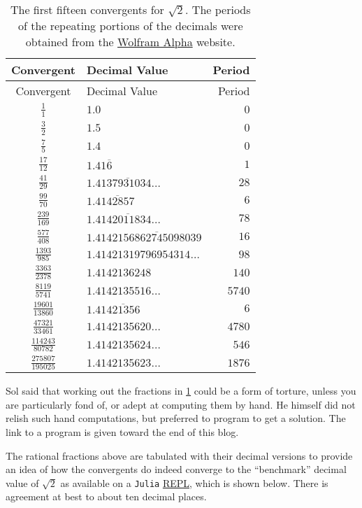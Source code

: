 \documentclass[
  a4paper,
]{article}
\begin{document}
\begin{longtable}[]{@{}clr@{}}
\caption{\label{tbl:sqrt2convergents}The first fifteen convergents for
\(\sqrt{2}\). The periods of the repeating portions of the decimals were
obtained from the \href{https://www.wolframalpha.com}{Wolfram Alpha}
website.}\tabularnewline
\toprule\noalign{}
Convergent & Decimal Value & Period \\
\midrule\noalign{}
\endfirsthead
\toprule\noalign{}
Convergent & Decimal Value & Period \\
\midrule\noalign{}
\endhead
\bottomrule\noalign{}
\endlastfoot
\(\frac{1}{1}\) & \(1.0\) & \(0\) \\
\(\frac{3}{2}\) & \(1.5\) & \(0\) \\
\(\frac{7}{5}\) & \(1.4\) & \(0\) \\
\(\frac{17}{12}\) & \(1.41\overline{6}\) & \(1\) \\
\(\frac{41}{29}\) & \(1.\overline{4137931034\dots}\) & \(28\) \\
\(\frac{99}{70}\) & \(1.4\overline{142857}\) & \(6\) \\
\(\frac{239}{169}\) & \(1.\overline{4142011834\dots}\) & \(78\) \\
\(\frac{577}{408}\) & \(1.414\overline{2156862745098039}\) & \(16\) \\
\(\frac{1393}{985}\) & \(1.41421319796954314\dots\) & \(98\) \\
\(\frac{3363}{2378}\) & \(1.4142136248\) & \(140\) \\
\(\frac{8119}{5741}\) & \(1.4142135516\dots\) & \(5740\) \\
\(\frac{19601}{13860}\) & \(1.41\overline{421356}\) & \(6\) \\
\(\frac{47321}{33461}\) & \(1.4142135620\dots\) & \(4780\) \\
\(\frac{114243}{80782}\) & \(1.4142135624\dots\) & \(546\) \\
\(\frac{275807}{195025}\) & \(1.4142135623\dots\) & \(1876\) \\
\end{longtable}

Sol said that working out the fractions in \cref{tbl:sqrt2convergents}
could be a form of torture, unless you are particularly fond of, or
adept at computing them by hand. He himself did not relish such hand
computations, but preferred to program to get a solution. The link to a
program is given toward the end of this blog.

The rational fractions above are tabulated with their decimal versions
to provide an idea of how the convergents do indeed converge to the
``benchmark'' decimal value of \(\sqrt{2}\) as available on a
\texttt{Julia}
\href{https://en.wikipedia.org/wiki/Read\%E2\%80\%93eval\%E2\%80\%93print_loop}{REPL},
which is shown below. There is agreement at best to about ten decimal
places.
\end{document}
